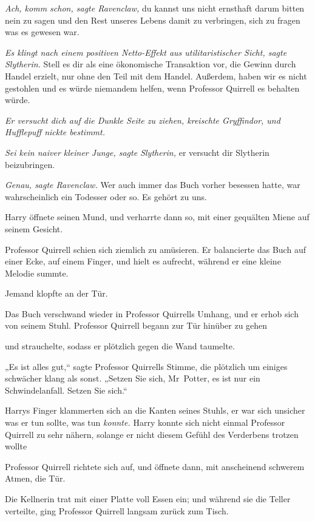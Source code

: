 {\emph{Ach, komm schon, sagte Ravenclaw,} du kannst uns nicht ernsthaft darum bitten nein zu sagen und den Rest unseres Lebens damit zu verbringen, sich zu fragen was es gewesen war.

\emph{Es klingt nach einem positiven Netto-Effekt aus utilitaristischer Sicht, sagte Slytherin.} Stell es dir als eine ökonomische Transaktion vor, die Gewinn durch Handel erzielt, nur ohne den Teil mit dem Handel. Außerdem, haben wir es nicht gestohlen und es würde niemandem helfen, wenn Professor Quirrell es behalten würde.

\emph{Er versucht dich auf die Dunkle Seite zu ziehen, kreischte Gryffindor, und Hufflepuff nickte bestimmt.}

\emph{Sei kein naiver kleiner Junge, sagte Slytherin,} er versucht dir Slytherin beizubringen.

\emph{Genau, sagte Ravenclaw.} Wer auch immer das Buch vorher besessen hatte, war wahrscheinlich ein Todesser oder so. Es gehört zu uns.

Harry öffnete seinen Mund, und verharrte dann so, mit einer gequälten Miene auf seinem Gesicht.

Professor Quirrell schien sich ziemlich zu amüsieren. Er balancierte das Buch auf einer Ecke, auf einem Finger, und hielt es aufrecht, während er eine kleine Melodie summte.

Jemand klopfte an der Tür.

Das Buch verschwand wieder in Professor Quirrells Umhang, und er erhob sich von seinem Stuhl. Professor Quirrell begann zur Tür hinüber zu gehen \later

\later und strauchelte, sodass er plötzlich gegen die Wand taumelte.

„Es ist alles gut,“ sagte Professor Quirrells Stimme, die plötzlich um einiges schwächer klang als sonst. „Setzen Sie sich, Mr~Potter, es ist nur ein Schwindelanfall. Setzen Sie sich.“

Harrys Finger klammerten sich an die Kanten seines Stuhls, er war sich unsicher was er tun sollte, was tun \emph{konnte.} Harry konnte sich nicht einmal Professor Quirrell zu sehr nähern, solange er nicht diesem Gefühl des Verderbens trotzen wollte \later

Professor Quirrell richtete sich auf, und öffnete dann, mit anscheinend schwerem Atmen, die Tür.

Die Kellnerin trat mit einer Platte voll Essen ein; und während sie die Teller verteilte, ging Professor Quirrell langsam zurück zum Tisch.

}
